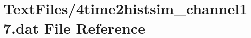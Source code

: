 \hypertarget{4time2histsim__channel17_8dat}{}\section{Text\+Files/4time2histsim\+\_\+channel17.dat File Reference}
\label{4time2histsim__channel17_8dat}
